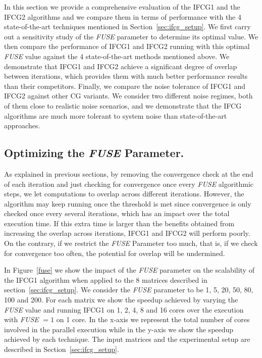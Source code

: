 In this section we provide a comprehensive evaluation of the IFCG1 and the IFCG2 algorithms 
and we compare them in terms of performance with the 4 state-of-the-art techniques mentioned in Section~\ref{sec:ifcg_setup}.
We first carry out a sensitivity study of the \emph{FUSE} parameter to determine its optimal value. 
We then compare the performance of IFCG1 and IFCG2 running with this optimal \emph{FUSE} value against the 4 state-of-the-art methods mentioned above.
We demonstrate that IFCG1 and IFCG2 achieve a significant degree of overlap between iterations, which provides them with much better performance results than their competitors.
Finally, we compare the noise tolerance of IFCG1 and IFCG2 against other CG variants.
We consider two different noise regimes, both of them close to realistic noise scenarios, and we demonstrate that the IFCG algorithms are much more tolerant to system noise than state-of-the-art approaches. 

\subsection{Optimizing the \emph{FUSE} Parameter.}
\label{sec:ifcg_fuse}

As explained in previous sections, by removing the convergence check at the end of each iteration and just checking for convergence once every \emph{FUSE} algorithmic steps, we let computations to overlap across different iterations.
However, the algorithm may keep running once the threshold is met since convergence is only checked once every several iterations, which has an impact over the total execution time.
If this extra time is larger than the benefits obtained from increasing the overlap across iterations, IFCG1 and IFCG2 will perform poorly.
On the contrary, if we restrict the \emph{FUSE} Parameter too much, that is, if we check for convergence too often, the potential for overlap will be undermined.

In Figure~\ref{fuse} we show the impact of the \emph{FUSE} parameter on the 
scalability of the IFCG1 algorithm when applied to the 8 matrices described in 
section~\ref{sec:ifcg_setup}.
We consider the \emph{FUSE} parameter to be 1, 5, 20, 50, 80, 100 and 200.
For each matrix we show the speedup achieved by varying the \emph{FUSE} value and running IFCG1 on 1, 2, 4, 8 and 16 cores over the execution with \emph{FUSE} $=1$ on 1 core.
In the x-axis we represent the total number of cores involved in the parallel execution while in the y-axis we show the speedup achieved by each technique.
The input matrices and the experimental setup are described in Section~\ref{sec:ifcg_setup}.

